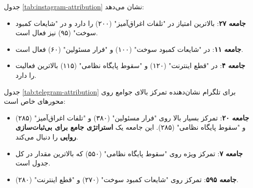 \documentclass{article}
\begin{document}
\begin{table}[h!]
	\centering
	\caption{جدول تعلق جامعه - اینستاگرام (بخشی از داده‌ها)}
	\label{tab:instagram-attribution}
\end{table}
	
	جدول \ref{tab:instagram-attribution} نشان می‌دهد:
	\begin{itemize}
		\item \textbf{جامعه ۲۷}: بالاترین امتیاز در "تلفات اغراق‌آمیز" (۲۰۰) را دارد و در "شایعات کمبود سوخت" (۹۵) نیز فعال است.
		\item \textbf{جامعه ۱۱}: در "شایعات کمبود سوخت" (۱۰۰) و "فرار مسئولین" (۶۰) فعال است.
		\item \textbf{جامعه ۴}: در "قطع اینترنت" (۱۲۰) و "سقوط پایگاه نظامی" (۱۱۵) بالاترین فعالیت را دارد.
	\end{itemize}
	
\begin{table}[h!]
	\centering
	\caption{جدول تعلق جامعه - تلگرام (بخشی از داده‌ها)}
	\label{tab:telegram-attribution}
\end{table}
	
	جدول \ref{tab:telegram-attribution} برای تلگرام نشان‌دهنده تمرکز بالای جوامع روی محورهای خاص است:
	\begin{itemize}
		\item \textbf{جامعه ۲۰}: تمرکز بسیار بالا روی "فرار مسئولین" (۳۸۰) و "تلفات اغراق‌آمیز" (۲۸۵) و "سقوط پایگاه نظامی" (۲۸۵). این جامعه یک \textbf{استراتژی جامع برای بی‌ثبات‌سازی روایی} را دنبال می‌کند.
		\item \textbf{جامعه ۷}: تمرکز ویژه روی "سقوط پایگاه نظامی" (۵۵۰) که بالاترین مقدار در کل جدول است.
		\item \textbf{جامعه ۵۹۵}: تمرکز روی "شایعات کمبود سوخت" (۲۷۰) و "قطع اینترنت" (۲۸۰).
	\end{itemize}
	
\end{document}

